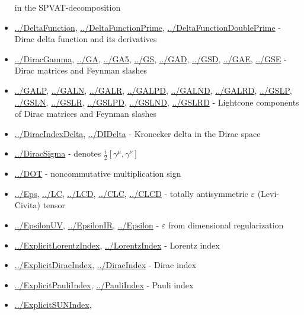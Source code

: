 \documentclass[../FeynCalcManual.tex]{subfiles}
\begin{document}
\begin{itemize}
  in the SPVAT-decomposition
\item
  \hyperlink{../deltafunction}{../DeltaFunction},
  \hyperlink{../deltafunctionprime}{../DeltaFunctionPrime},
  \hyperlink{../deltafunctiondoubleprime}{../DeltaFunctionDoublePrime} -
  Dirac delta function and its derivatives
\item
  \hyperlink{../diracgamma}{../DiracGamma}, \hyperlink{../ga}{../GA},
  \hyperlink{../ga5}{../GA5}, \hyperlink{../gs}{../GS},
  \hyperlink{../gad}{../GAD}, \hyperlink{../gsd}{../GSD},
  \hyperlink{../gae}{../GAE}, \hyperlink{../gse}{../GSE} - Dirac
  matrices and Feynman slashes
\item
  \hyperlink{../galp}{../GALP}, \hyperlink{../galn}{../GALN},
  \hyperlink{../galr}{../GALR}, \hyperlink{../galpd}{../GALPD},
  \hyperlink{../galnd}{../GALND}, \hyperlink{../galrd}{../GALRD},
  \hyperlink{../gslp}{../GSLP}, \hyperlink{../gsln}{../GSLN},
  \hyperlink{../gslr}{../GSLR}, \hyperlink{../gslpd}{../GSLPD},
  \hyperlink{../gslnd}{../GSLND}, \hyperlink{../gslrd}{../GSLRD} -
  Lightcone components of Dirac matrices and Feynman slashes
\item
  \hyperlink{../diracindexdelta}{../DiracIndexDelta},
  \hyperlink{../didelta}{../DIDelta} - Kronecker delta in the Dirac
  space
\item
  \hyperlink{../diracsigma}{../DiracSigma} - denotes
  \(\frac{i}{2}[\gamma^\mu, \gamma^\nu]\)
\item
  \hyperlink{../dot}{../DOT} - noncommutative multiplication sign
\item
  \hyperlink{../eps}{../Eps}, \hyperlink{../lc}{../LC},
  \hyperlink{../lcd}{../LCD}, \hyperlink{../clc}{../CLC},
  \hyperlink{../clcd}{../CLCD} - totally antisymmetric \(\varepsilon\)
  (Levi-Civita) tensor
\item
  \hyperlink{../epsilonuv}{../EpsilonUV},
  \hyperlink{../epsilonir}{../EpsilonIR},
  \hyperlink{../epsilon}{../Epsilon} - \(\varepsilon\) from dimensional
  regularization
\item
  \hyperlink{../explicitlorentzindex}{../ExplicitLorentzIndex},
  \hyperlink{../lorentzindex}{../LorentzIndex} - Lorentz index
\item
  \hyperlink{../explicitdiracindex}{../ExplicitDiracIndex},
  \hyperlink{../diracindex}{../DiracIndex} - Dirac index
\item
  \hyperlink{../explicitpauliindex}{../ExplicitPauliIndex},
  \hyperlink{../pauliindex}{../PauliIndex} - Pauli index
\item
  \hyperlink{../explicitsunindex}{../ExplicitSUNIndex},

\end{itemize}
\end{document}
